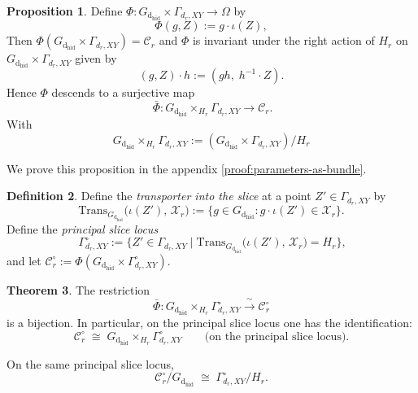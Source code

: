 \documentclass{article}
\newcommand{\dhid}{\operatorname{d_{hid}}}
\theoremstyle{definition}
\newtheorem{theorem}{Theorem}[section]
\newtheorem{proposition}[theorem]{Proposition}
\newtheorem{definition}[theorem]{Definition}
\begin{document}
\begin{proposition}\label{prop:parameters-as-bundle}
    Define $\Phi \colon G_{\dhid} \times \Gamma_{d_r,XY} \to \Omega$ by
\begin{equation}
\Phi(g, Z) := g \cdot \iota(Z),
\end{equation}
Then $\Phi(G_{\dhid} \times \Gamma_{d_r,XY}) = \mathcal{C}_r$ and $\Phi$ is invariant under the right action of $H_{r}$ on $G_{\dhid}   \times \Gamma_{d_r,XY}$ given by
\begin{equation}
(g, Z) \cdot h := (g h,\; h^{-1} \cdot Z).
\end{equation}
Hence $\Phi$ descends to a surjective map
\[\
\bar\Phi \colon G_{\dhid} \times_{H_{r}} \Gamma_{d_r,XY} \longrightarrow \mathcal{C}_r.
\]
With 
\begin{equation*}
     G_{\dhid} \times_{H_{r}} \Gamma_{d_r,XY} := (G_{\dhid} \times \Gamma_{d_r,XY}) / H_{r}
\end{equation*}
\end{proposition}
\noindent
We prove this proposition in the appendix \ref{proof:parameters-as-bundle}.
\begin{definition}
Define the \emph{transporter into the slice} at a point $Z' \in \Gamma_{d_r,XY}$ by
\[
\mathrm{Trans}_{G_{\dhid}}\!\bigl(\iota(Z'),\, \mathcal{X}_r\bigr)
:= \bigl\{ g \in G_{\dhid} : g \cdot \iota(Z') \in \mathcal{X}_r \bigr\}.
\]
Define the \emph{principal slice locus}
\[\
\Gamma_{d_r,XY}^{\circ} := \bigl\{ Z' \in \Gamma_{d_r,XY} \;\big|\;
\mathrm{Trans}_{G_{\dhid}}\!\bigl(\iota(Z'),\, \mathcal{X}_r\bigr) = H_{r} \bigr\},
\]
and let $\mathcal{C}_r^{\circ} := \Phi(G_{\dhid} \times \Gamma_{d_r,XY}^{\circ})$.
\end{definition}
\begin{theorem}\label{thm:critical-bundle}
The restriction
\[
\bar\Phi \colon G_{\dhid} \times_{H_{r}} \Gamma_{d_r,XY}^{\circ}
\xrightarrow{\;\sim\;} \mathcal{C}_r^{\circ}
\]
is a bijection.  In particular, on the principal slice locus one has the identification:
\begin{equation}
\mathcal{C}_r^{\circ} \;\cong\; G_{\dhid} \times_{H_{r}} \Gamma_{d_r,XY}^{\circ}
\qquad\text{(on the principal slice locus).}
\end{equation}

\medskip\noindent
On the same principal slice locus,
\begin{equation}
\mathcal{C}_r^{\circ} / G_{\dhid} \;\cong\; \Gamma_{d_r,XY}^{\circ} / H_{r}.
\end{equation}
\end{theorem}
\end{document}
